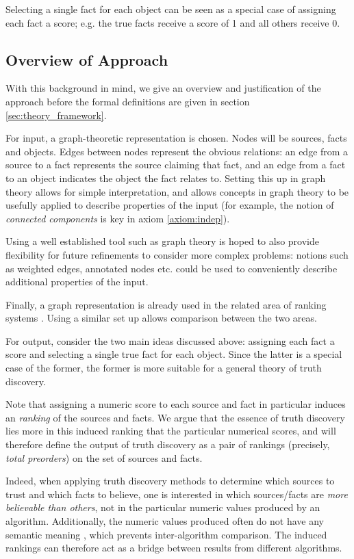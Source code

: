 \documentclass[../main.tex]{subfiles}
\begin{document}
Selecting a single fact for each object can be seen as a special case of
assigning each fact a score; e.g. the true facts receive a score of 1 and all
others receive 0.

\subsection{Overview of Approach}
\label{sec:theory_approach_overview}

With this background in mind, we give an overview and justification of the
approach before the formal definitions are given in section
\ref{sec:theory_framework}.

For input, a graph-theoretic representation is chosen. Nodes will be sources,
facts and objects. Edges between nodes represent the obvious relations: an edge
from a source to a fact represents the source claiming that fact, and an edge
from a fact to an object indicates the object the fact relates to. Setting this
up in graph theory allows for simple interpretation, and allows concepts in
graph theory to be usefully applied to describe properties of the input (for
example, the notion of \emph{connected components} is key in axiom
\ref{axiom:indep}).

Using a well established tool such as graph theory is hoped to also provide
flexibility for future refinements to consider more complex problems: notions
such as weighted edges, annotated nodes etc. could be used to conveniently
describe additional properties of the input.

Finally, a graph representation is already used in the related area of ranking
systems \cite{altman_foundations, altman_personalised}. Using a similar set up
allows comparison between the two areas.

For output, consider the two main ideas discussed above: assigning each fact a
score and selecting a single true fact for each object. Since the latter is a
special case of the former, the former is more suitable for a general theory of
truth discovery.

Note that assigning a numeric score to each source and fact in particular
induces an \emph{ranking} of the sources and facts. We argue that the essence
of truth discovery lies more in this induced ranking that the particular
numerical scores, and will therefore define the output of truth discovery as a
pair of rankings (precisely, \emph{total preorders}) on the set of sources and
facts.

Indeed, when applying truth discovery methods to determine which sources to
trust and which facts to believe, one is interested in which sources/facts are
\emph{more believable than others}, not in the particular numeric values
produced by an algorithm. Additionally, the numeric values produced often do
not have any semantic meaning \cite{pasternack}, which prevents inter-algorithm
comparison.  The induced rankings can therefore act as a bridge between results
from different algorithms.
\end{document}
